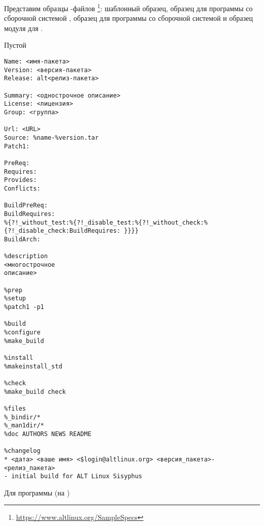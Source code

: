 Представим образцы -файлов%
\footnote{\href{https://www.altlinux.org/SampleSpecs}{https://www.altlinux.org/SampleSpecs}}: шаблонный образец,
образец для программы со сборочной системой , образец для программы со сборочной системой
 и образец модуля для .

 Пустой 
\begin{Verbatim}[breaklines=true,breakanywhere=true,fontsize=\scriptsize]
Name: <имя-пакета>
Version: <версия-пакета>
Release: alt<релиз-пакета>
	
Summary: <однострочное описание>
License: <лицензия>
Group: <группа>

Url: <URL>
Source: %name-%version.tar
Patch1:
	
PreReq:
Requires:
Provides:
Conflicts:
	
BuildPreReq:
BuildRequires:
%{?!_without_test:%{?!_disable_test:%{?!_without_check:%{?!_disable_check:BuildRequires: }}}}
BuildArch:
	
%description
<многострочное
описание>
	
%prep
%setup
%patch1 -p1

%build
%configure
%make_build
		
%install
%makeinstall_std
	
%check
%make_build check
		
%files
%_bindir/*
%_man1dir/*
%doc AUTHORS NEWS README
		
%changelog
* <дата> <ваше имя> <$login@altlinux.org> <версия_пакета>-<релиз_пакета>
- initial build for ALT Linux Sisyphus
\end{Verbatim}

\newpage

 Для программы (на )
	
